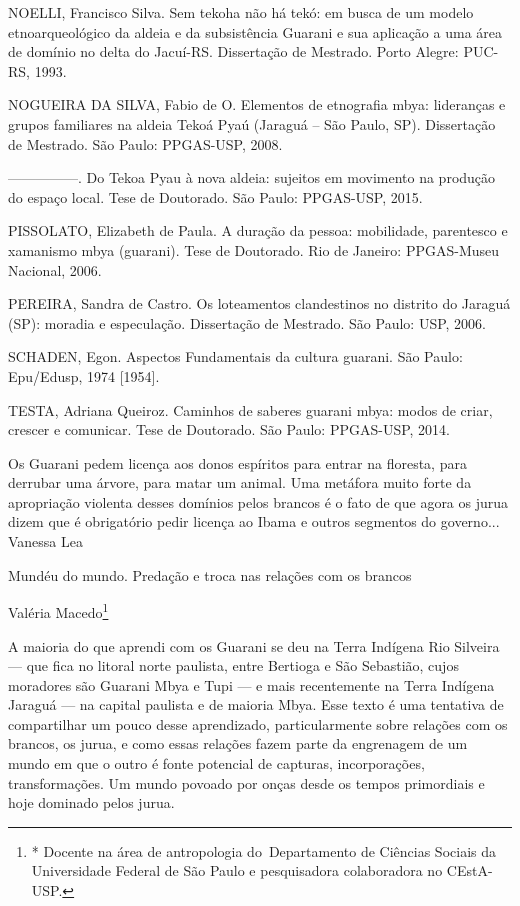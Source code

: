 \documentclass{article}
\begin{document}
NOELLI, Francisco Silva. Sem tekoha n\~ao h\'a tek\'o: em busca de um
modelo etnoarqueol\'ogico da aldeia e da subsist\^encia Guarani e sua
aplica\c{c}\~ao a uma \'area de dom\'inio no delta do Jacu\'i-RS.
Disserta\c{c}\~ao de Mestrado. Porto Alegre: PUC-RS, 1993.

NOGUEIRA DA SILVA, Fabio de O. Elementos de etnografia mbya:
lideran\c{c}as e grupos familiares na aldeia Teko\'a Pya\'u (Jaragu\'a
-- S\~ao Paulo, SP). Disserta\c{c}\~ao de Mestrado. S\~ao Paulo:
PPGAS-USP, 2008.

{}---{}---{}---{}---{}---. Do Tekoa Pyau \`a nova aldeia: sujeitos em
movimento na produ\c{c}\~ao do espa\c{c}o local. Tese de Doutorado.
S\~ao Paulo: PPGAS-USP, 2015.

PISSOLATO, Elizabeth de Paula. A dura\c{c}\~ao da pessoa: mobilidade,
parentesco e xamanismo mbya (guarani). Tese de Doutorado. Rio de
Janeiro: PPGAS-Museu Nacional, 2006.  

PEREIRA, Sandra de Castro. Os loteamentos clandestinos no distrito do
Jaragu\'a (SP): moradia e especula\c{c}\~ao. Disserta\c{c}\~ao de
Mestrado. S\~ao Paulo: USP, 2006.

SCHADEN, Egon. Aspectos Fundamentais da cultura guarani. S\~ao Paulo:
Epu/Edusp, 1974 [1954].

TESTA, Adriana Queiroz. Caminhos de saberes guarani mbya: modos de
criar, crescer e comunicar. Tese de Doutorado. S\~ao Paulo: PPGAS-USP,
2014.

Os Guarani pedem licen\c{c}a aos donos esp\'iritos para entrar na
floresta, para derrubar uma \'arvore, para matar um animal. Uma
met\'afora muito forte da apropria\c{c}\~ao violenta desses dom\'inios
pelos brancos \'e o fato de que agora os jurua dizem que \'e
obrigat\'orio pedir licen\c{c}a ao Ibama e outros segmentos do
governo... Vanessa Lea 

Mund\'eu do mundo.  Preda\c{c}\~ao e troca nas rela\c{c}\~oes com os
brancos 

Val\'eria Macedo\footnote{* Docente na \'area de antropologia
do~Departamento de Ci\^encias Sociais da Universidade Federal de S\~ao
Paulo e pesquisadora colaboradora no CEstA-USP.}

A maioria do que aprendi com os Guarani se deu na Terra Ind\'igena Rio
Silveira --- que fica no litoral norte paulista, entre Bertioga e S\~ao
Sebasti\~ao, cujos moradores s\~ao Guarani Mbya e Tupi --- e mais
recentemente na Terra Ind\'igena Jaragu\'a --- na capital paulista e de
maioria Mbya. Esse texto \'e uma tentativa de compartilhar um pouco
desse aprendizado, particularmente sobre rela\c{c}\~oes com os brancos,
os jurua, e como essas rela\c{c}\~oes fazem parte da engrenagem de um
mundo em que o outro \'e fonte potencial de capturas,
incorpora\c{c}\~oes, transforma\c{c}\~oes. Um mundo povoado por
on\c{c}as desde os tempos primordiais e hoje dominado pelos jurua. 
\end{document}
